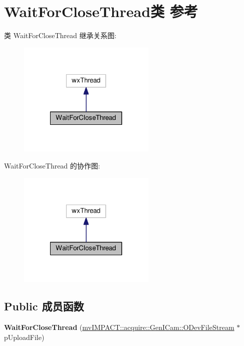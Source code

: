 \hypertarget{class_wait_for_close_thread}{\section{Wait\+For\+Close\+Thread类 参考}
\label{class_wait_for_close_thread}
}


类 Wait\+For\+Close\+Thread 继承关系图\+:
\nopagebreak
\begin{figure}[H]
\begin{center}
\leavevmode
\includegraphics[width=186pt]{class_wait_for_close_thread__inherit__graph}
\end{center}
\end{figure}


Wait\+For\+Close\+Thread 的协作图\+:
\nopagebreak
\begin{figure}[H]
\begin{center}
\leavevmode
\includegraphics[width=186pt]{class_wait_for_close_thread__coll__graph}
\end{center}
\end{figure}
\subsection*{Public 成员函数}
\begin{DoxyCompactItemize}
\item 
\hypertarget{class_wait_for_close_thread_a2f8410358c95e3a1750dc5e0b6c814a9}{{\bfseries Wait\+For\+Close\+Thread} (\hyperlink{group___gen_i_cam_interface_file_stream_ga7d9df27b854d193a06556bda6f1a9488}{mv\+I\+M\+P\+A\+C\+T\+::acquire\+::\+Gen\+I\+Cam\+::\+O\+Dev\+File\+Stream} $\ast$p\+Upload\+File)}\label{class_wait_for_close_thread_a2f8410358c95e3a1750dc5e0b6c814a9}

\end{DoxyCompactItemize}
